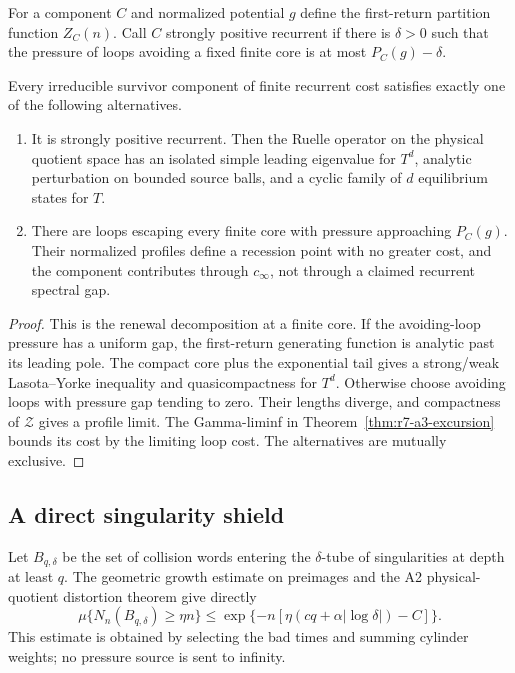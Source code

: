 For a component $C$ and normalized potential $g$ define the first-return
partition function $Z_C(n)$.  Call $C$ strongly positive recurrent if there is
$\delta>0$ such that the pressure of loops avoiding a fixed finite core is at
most $P_C(g)-\delta$.

\begin{theorem}
\label{thm:r7-a3-survivor}
Every irreducible survivor component of finite recurrent cost satisfies exactly
one of the following alternatives.

\begin{enumerate}[label=(\roman*)]
\item It is strongly positive recurrent.  Then the Ruelle operator on the
physical quotient space has an isolated simple leading eigenvalue for $T^d$,
analytic perturbation on bounded source balls, and a cyclic family of $d$
equilibrium states for $T$.
\item There are loops escaping every finite core with pressure approaching
$P_C(g)$.  Their normalized profiles define a recession point with no greater
cost, and the component contributes through $c_\infty$, not through a claimed
recurrent spectral gap.
\end{enumerate}
\end{theorem}

\begin{proof}
This is the renewal decomposition at a finite core.  If the avoiding-loop
pressure has a uniform gap, the first-return generating function is analytic
past its leading pole.  The compact core plus the exponential tail gives a
strong/weak Lasota--Yorke inequality and quasicompactness for $T^d$.
Otherwise choose avoiding loops with pressure gap tending to zero.  Their
lengths diverge, and compactness of $\mathcal Z$ gives a profile limit.  The
Gamma-liminf in Theorem~\ref{thm:r7-a3-excursion} bounds its cost by the
limiting loop cost.  The alternatives are mutually exclusive.
\end{proof}

\subsection{A direct singularity shield}

Let $B_{q,\delta}$ be the set of collision words entering the $\delta$-tube of
singularities at depth at least $q$.  The geometric growth estimate on
preimages and the A2 physical-quotient distortion theorem give directly
\[
 \mu\{N_n(B_{q,\delta})\ge\eta n\}
 \le \exp\{-n[\eta(cq+\alpha|\log\delta|)-C]\}.
\]
This estimate is obtained by selecting the bad times and summing cylinder
weights; no pressure source is sent to infinity.


